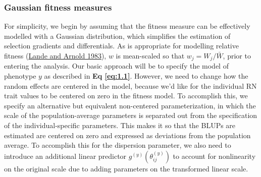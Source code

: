 \documentclass{article}
\begin{document}
\hypertarget{gaussian-fitness-measures}{%
\subsubsection{Gaussian fitness
measures}\label{gaussian-fitness-measures}}

For simplicity, we begin by assuming that the fitness measure can be
effectively modelled with a Gaussian distribution, which simplifies the
estimation of selection gradients and differentials. As is appropriate
for modelling relative fitness (\protect\hyperlink{ref-Lande1983}{Lande
and Arnold 1983}), \(w\) is mean-scaled so that \(w_j = W_j/\bar{W}\),
prior to entering the analysis. Our basic approach will be to specify
the model of phenotype \(y\) as described in \textbf{Eq \ref{eq:1.1}}.
However, we need to change how the random effects are centered in the
model, because we'd like for the individual RN trait values to be
centered on zero in the fitness model. To accomplish this, we specify an
alternative but equivalent non-centered parameterization, in which the
scale of the population-average parameters is separated out from the
specification of the individual-specific parameters. This makes it so
that the BLUPs are estimated are centered on zero and expressed as
deviations from the population average. To accomplish this for the
dispersion parameter, we also need to introduce an additional linear
predictor \(g^{(y)} \left( \theta^{(y)}_{ij} \right)\) to account for
nonlinearity on the original scale due to adding parameters on the
transformed linear scale.
\end{document}
